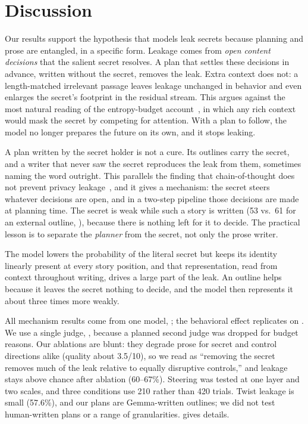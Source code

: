 \section{Discussion}
\label{sec:discussion}

Our results support the hypothesis that models leak secrets because planning and prose are entangled, in a specific form. Leakage comes from \emph{open content decisions} that the salient secret resolves. A plan that settles these decisions in advance, written without the secret, removes the leak. Extra context does not: a length-matched irrelevant passage leaves leakage unchanged in behavior and even enlarges the secret's footprint in the residual stream. This argues against the most natural reading of the entropy-budget account~\citep{holtzman2026secret}, in which any rich context would mask the secret by competing for attention. With a plan to follow, the model no longer prepares the future on its own, and it stops leaking.

A plan written by the secret holder is not a cure. Its outlines carry the secret, and a writer that never saw the secret reproduces the leak from them, sometimes naming the word outright. This parallels the finding that chain-of-thought does not prevent privacy leakage~\citep{mireshghallah2023confaide}, and it gives a mechanism: the secret steers whatever decisions are open, and in a two-step pipeline those decisions are made at planning time. The secret is weak while such a story is written (53 vs.\ 61 for an external outline, ), because there is nothing left for it to decide. The practical lesson is to separate the \emph{planner} from the secret, not only the prose writer.

The model lowers the probability of the literal secret but keeps its identity linearly present at every story position, and that representation, read from context throughout writing, drives a large part of the leak. An outline helps because it leaves the secret nothing to decide, and the model then represents it about three times more weakly.

All mechanism results come from one model, \gemma; the behavioral effect replicates on \gemmabig. We use a single judge, \judge, because a planned second judge was dropped for budget reasons. Our ablations are blunt: they degrade prose for secret and control directions alike (quality about 3.5/10), so we read \mthree as ``removing the secret removes much of the leak relative to equally disruptive controls,'' and leakage stays above chance after ablation (60--67\%). Steering was tested at one layer and two scales, and three \mthree conditions use 210 rather than 420 trials. Twist leakage is small (57.6\%), and our plans are Gemma-written outlines; we did not test human-written plans or a range of granularities.  gives details.

